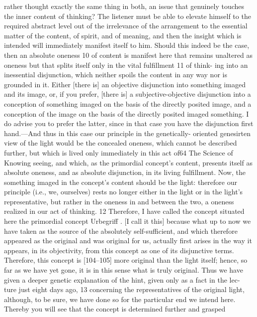rather thought exactly the same thing in both, an issue that genuinely touches
the inner content of thinking? The listener must be able to elevate himself to
the required abstract level out of the irrelevance of the arrangement to the
essential matter of the content, of spirit, and of meaning, and then the insight
which is intended will immediately manifest itself to him. Should this indeed
be the case, then an absolute oneness 10 of content is manifest here that remains
unaltered as oneness but that splits itself only in the vital fulfillment 11 of think-
ing into an inessential disjunction, which neither spoils the content in any way
nor is grounded in it. Either [there is] an objective disjunction into something
imaged and its image, or, if you prefer, [there is] a subjective-objective disjunction
into a conception of something imaged on the basis of the directly posited
image, and a conception of the image on the basis of the directly posited imaged
something. I do advise you to prefer the latter, since in that case you have the
disjunction first hand.—And thus in this case our principle in the genetically-
oriented {genesirten} view of the light would be the concealed oneness, which
cannot be described further, but which is lived only immediately in this act of64
The Science of Knowing
seeing, and which, as the primordial concept’s content, presents itself as
absolute oneness, and as absolute disjunction, in its living fulfillment. Now, the
something imaged in the concept’s content should be the light: therefore our
principle (i.e., we, ourselves) rests no longer either in the light or in the light’s
representative, but rather in the oneness in and between the two, a oneness
realized in our act of thinking. 12 Therefore, I have called the concept situated
here the primordial concept {Urbegriff }. [I call it this] because what up to now we
have taken as the source of the absolutely self-sufficient, and which therefore
appeared as the original and was original for us, actually first arises in the way
it appears, in its objectivity, from this concept as one of its disjunctive terms.
Therefore, this concept is [104–105] more original than the light itself; hence,
so far as we have yet gone, it is in this sense what is truly original. Thus we have
given a deeper genetic explanation of the hint, given only as a fact in the lec-
ture just eight days ago, 13 concerning the representatives of the original light,
although, to be sure, we have done so for the particular end we intend here.
Thereby you will see that the concept is determined further and grasped
